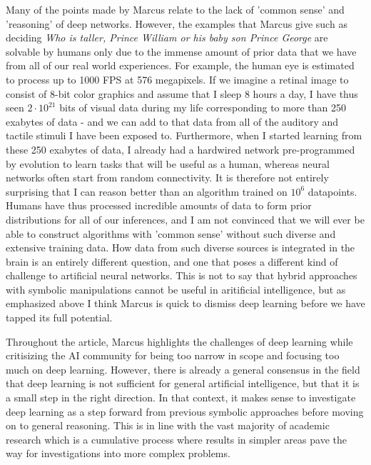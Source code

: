 \documentclass{article}
\begin{document}
Many of the points made by Marcus relate to the lack of 'common sense' and 'reasoning' of deep networks. However, the examples that Marcus give such as deciding \textit{Who is taller, Prince William or his baby son Prince George} are solvable by humans only due to the immense amount of prior data that we have from all of our real world experiences.
For example, the human eye is estimated to process up to 1000 FPS at 576 megapixels.
If we imagine a retinal image to consist of 8-bit color graphics and assume that I sleep 8 hours a day, I have thus seen $2\cdot 10^{21}$ bits of visual data during my life corresponding to more than 250 exabytes of data - and we can add to that data from all of the auditory and tactile stimuli I have been exposed to.
Furthermore, when I started learning from these 250 exabytes of data, I already had a hardwired network pre-programmed by evolution to learn tasks that will be useful as a human, whereas neural networks often start from random connectivity. It is therefore not entirely surprising that  I can reason better than an algorithm trained on $10^6$ datapoints.
Humans have thus processed incredible amounts of data to form prior distributions for all of our inferences, and I am not convinced that we will ever be able to construct algorithms with 'common sense' without such diverse and extensive training data. 
How data from such diverse sources is integrated in the brain is an entirely different question, and one that poses a different kind of challenge to artificial neural networks.
This is not to say that hybrid approaches with symbolic manipulations cannot be useful in aritificial intelligence, but as emphasized above I think Marcus is quick to dismiss deep learning before we have tapped its full potential.

Throughout the article, Marcus highlights the challenges of deep learning while critisizing the AI community for being too narrow in scope and focusing too much on deep learning. However, there is already a general consensus in the field that deep learning is not sufficient for general artificial intelligence, but that it is a small step in the right direction. In that context, it makes sense to investigate deep learning as a step forward from previous symbolic approaches before moving on to general reasoning. This is in line with the vast majority of academic research which is a cumulative process where results in simpler areas pave the way for investigations into more complex problems.
\end{document}
